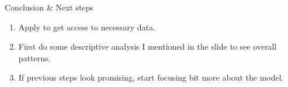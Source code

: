 \documentclass[aspectratio=169]{beamer}
\begin{document}
\begin{frame}{Conclusion \& Next steps}
	\begin{enumerate}
		\item Apply to get access to necessary data.
		\item First do some descriptive analysis I mentioned in the slide to see overall patterns.
		\item If previous steps look promising, start focusing bit more about the model.
	\end{enumerate}	
\end{frame}
\end{document}
